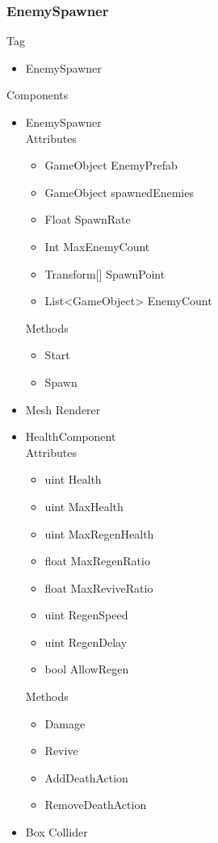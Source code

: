 \documentclass[11pt]{article}
\begin{document}
\subsubsection{EnemySpawner}
Tag
\begin{itemize}
\item EnemySpawner
\end{itemize}
Components
\begin{itemize}
\item EnemySpawner
\\Attributes
\begin{itemize}
\item GameObject EnemyPrefab
\item GameObject spawnedEnemies
\item Float SpawnRate
\item Int MaxEnemyCount
\item Transform[] SpawnPoint
\item List<GameObject> EnemyCount
\end{itemize}
Methods
\begin{itemize}
\item Start
\item Spawn
\end{itemize}
\item Mesh Renderer
\item HealthComponent
\\Attributes
\begin{itemize}
\item uint Health
\item uint MaxHealth
\item uint MaxRegenHealth
\item float MaxRegenRatio
\item float MaxReviveRatio
\item uint RegenSpeed
\item uint RegenDelay
\item bool AllowRegen
\end{itemize}
Methods
\begin{itemize}
\item Damage
\item Revive
\item AddDeathAction
\item RemoveDeathAction
\end{itemize}
\item Box Collider
\end{itemize}
\end{document}
